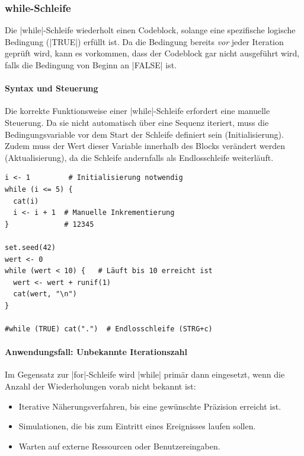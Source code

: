\documentclass[10pt,twocolumn]{scrartcl}
\renewcommand{\lstinline}{\mycoloredinline}
\begin{document}
\subsubsection{while-Schleife}

Die \lstinline|while|-Schleife wiederholt einen Codeblock, solange eine spezifische logische Bedingung (\lstinline|TRUE|) erfüllt ist. Da die Bedingung bereits \emph{vor} jeder Iteration geprüft wird, kann es vorkommen, dass der Codeblock gar nicht ausgeführt wird, falls die Bedingung von Beginn an \lstinline|FALSE| ist.

\paragraph{Syntax und Steuerung}

Die korrekte Funktionsweise einer \lstinline|while|-Schleife erfordert eine manuelle Steuerung. Da sie nicht automatisch über eine Sequenz iteriert, muss die Bedingungsvariable vor dem Start der Schleife definiert sein (Initialisierung). Zudem muss der Wert dieser Variable innerhalb des Blocks verändert werden (Aktualisierung), da die Schleife andernfalls als Endlosschleife weiterläuft.

\begin{lstlisting}
i <- 1         # Initialisierung notwendig
while (i <= 5) {
  cat(i)
  i <- i + 1  # Manuelle Inkrementierung
}             # 12345

set.seed(42)
wert <- 0
while (wert < 10) {   # Läuft bis 10 erreicht ist
  wert <- wert + runif(1)
  cat(wert, "\n")
}

#while (TRUE) cat(".")  # Endlosschleife (STRG+c)
\end{lstlisting}

\paragraph{Anwendungsfall: Unbekannte Iterationszahl}

Im Gegensatz zur \lstinline|for|-Schleife wird \lstinline|while| primär dann eingesetzt, wenn die Anzahl der Wiederholungen vorab nicht bekannt ist:

\begin{itemize}
\item Iterative Näherungsverfahren, bis eine gewünschte Präzision erreicht ist.
\item Simulationen, die bis zum Eintritt eines Ereignisses laufen sollen.
\item Warten auf externe Ressourcen oder Benutzereingaben.
\end{itemize}
\end{document}
